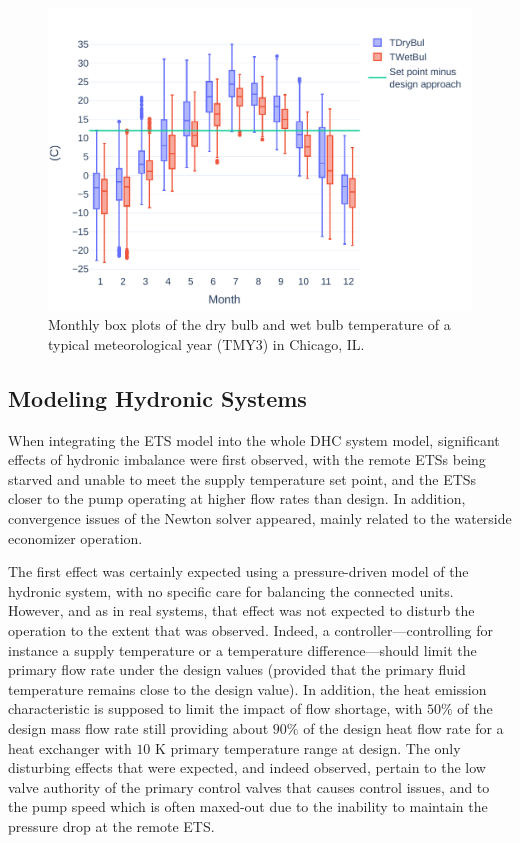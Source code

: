 \begin{figure}[!htbp]
    \centering
    \includegraphics[width=\linewidth]{../python_scripts/figures/weather_stats.pdf}
    \caption{Monthly box plots of the dry bulb and wet bulb temperature of a typical meteorological year (TMY3) in Chicago, IL.}
    \label{fig:weather_stats}
\end{figure}


\subsection{Modeling Hydronic Systems} \label{sec:balancing}

When integrating the ETS model into the whole DHC system model, significant effects of hydronic imbalance were first observed, with the remote ETSs being starved and unable to meet the supply temperature set point, and the ETSs closer to the pump operating at higher flow rates than design.
In addition, convergence issues of the Newton solver appeared, mainly related to the waterside economizer operation.

The first effect was certainly expected using a pressure-driven model of the hydronic system, with no specific care for balancing the connected units. However, and as in real systems, that effect was not expected to disturb the operation to the extent that was observed. Indeed, a controller---controlling for instance a supply temperature or a temperature difference---should limit the primary flow rate under the design values (provided that the primary fluid temperature remains close to the design value). In addition, the heat emission characteristic is supposed to limit the impact of flow shortage, with $50\%$ of the design mass flow rate still providing about $90\%$ of the design heat flow rate for a heat exchanger with $10$ K primary temperature range at design. The only disturbing effects that were expected, and indeed observed, pertain to the low valve authority of the primary control valves that causes control issues, and to the pump speed which is often maxed-out due to the inability to maintain the pressure drop at the remote ETS.

